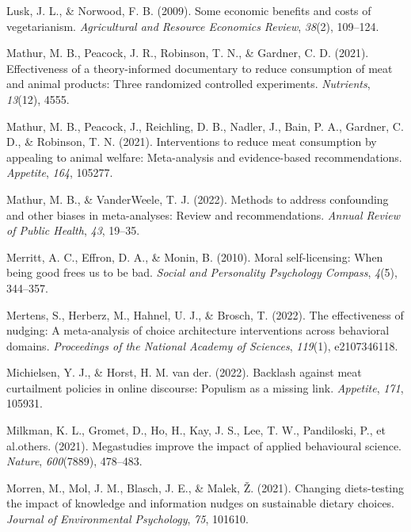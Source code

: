 \documentclass[
  man]{apa6}
\newlength{\cslhangindent}
\newenvironment{CSLReferences}[2] %
 {\begin{list}{}{%
  \setlength{\itemindent}{0pt}
  \setlength{\leftmargin}{0pt}
  \setlength{\parsep}{0pt}
  \ifodd #1
   \setlength{\leftmargin}{\cslhangindent}
   \setlength{\itemindent}{-1\cslhangindent}
  \fi
  \setlength{\itemsep}{#2\baselineskip}}}
 {\end{list}}
\begin{document}
\begin{CSLReferences}{1}{0}
Lusk, J. L., \& Norwood, F. B. (2009). Some economic benefits and costs of vegetarianism. \emph{Agricultural and Resource Economics Review}, \emph{38}(2), 109--124.

Mathur, M. B., Peacock, J. R., Robinson, T. N., \& Gardner, C. D. (2021). Effectiveness of a theory-informed documentary to reduce consumption of meat and animal products: Three randomized controlled experiments. \emph{Nutrients}, \emph{13}(12), 4555.

Mathur, M. B., Peacock, J., Reichling, D. B., Nadler, J., Bain, P. A., Gardner, C. D., \& Robinson, T. N. (2021). Interventions to reduce meat consumption by appealing to animal welfare: Meta-analysis and evidence-based recommendations. \emph{Appetite}, \emph{164}, 105277.

Mathur, M. B., \& VanderWeele, T. J. (2022). Methods to address confounding and other biases in meta-analyses: Review and recommendations. \emph{Annual Review of Public Health}, \emph{43}, 19--35.

Merritt, A. C., Effron, D. A., \& Monin, B. (2010). Moral self-licensing: When being good frees us to be bad. \emph{Social and Personality Psychology Compass}, \emph{4}(5), 344--357.

Mertens, S., Herberz, M., Hahnel, U. J., \& Brosch, T. (2022). The effectiveness of nudging: A meta-analysis of choice architecture interventions across behavioral domains. \emph{Proceedings of the National Academy of Sciences}, \emph{119}(1), e2107346118.

Michielsen, Y. J., \& Horst, H. M. van der. (2022). Backlash against meat curtailment policies in online discourse: Populism as a missing link. \emph{Appetite}, \emph{171}, 105931.

Milkman, K. L., Gromet, D., Ho, H., Kay, J. S., Lee, T. W., Pandiloski, P., et al.others. (2021). Megastudies improve the impact of applied behavioural science. \emph{Nature}, \emph{600}(7889), 478--483.

Morren, M., Mol, J. M., Blasch, J. E., \& Malek, Ž. (2021). Changing diets-testing the impact of knowledge and information nudges on sustainable dietary choices. \emph{Journal of Environmental Psychology}, \emph{75}, 101610.


\end{CSLReferences}
\end{document}
